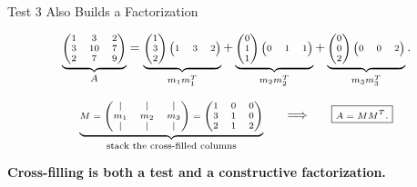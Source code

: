 \documentclass[10pt]{beamer}
\theoremstyle{definition}
\newcommand{\x}[1]{\alert{\textbf{#1}}}
\begin{document}
\begin{frame}[shrink=8]{Test 3 Also Builds a Factorization}

\[
\scriptsize
\underbrace{
\begin{pmatrix}
1&3&2\\
3&10&7\\
2&7&9
\end{pmatrix}}_{A}
=
\underbrace{
\begin{pmatrix}1\\3\\2\end{pmatrix}
\begin{pmatrix}1&3&2\end{pmatrix}}_{m_1m_1^T}
+
\underbrace{
\begin{pmatrix}0\\1\\1\end{pmatrix}
\begin{pmatrix}0&1&1\end{pmatrix}}_{m_2m_2^T}
+
\underbrace{
\begin{pmatrix}0\\0\\2\end{pmatrix}
\begin{pmatrix}0&0&2\end{pmatrix}}_{m_3m_3^T}.
\]

\vfill

\[
\scriptsize
\underbrace{
M=
\begin{pmatrix}
|&|&|\\
m_1&m_2&m_3\\
|&|&|
\end{pmatrix}
=
\begin{pmatrix}
1&0&0\\
3&1&0\\
2&1&2
\end{pmatrix}}_{\text{stack the cross-filled columns}}
\qquad\Longrightarrow\qquad
\boxed{A=MM^T.}
\]

\vfill

\begin{center}
\x{Cross-filling is both a test and a constructive factorization.}
\end{center}

\end{frame}
\end{document}
